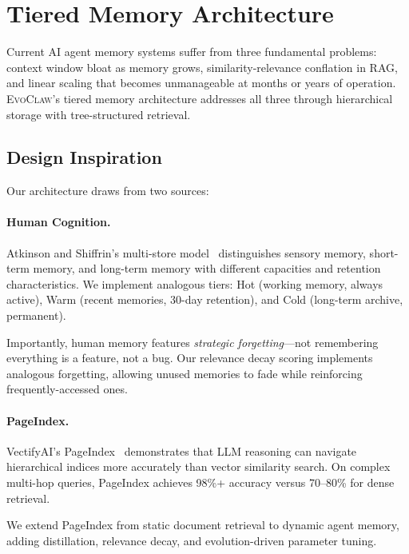 \documentclass{article}
\newcommand{\evoclaw}{\textsc{EvoClaw}}
\begin{document}

\section{Tiered Memory Architecture}
\label{sec:memory}

Current AI agent memory systems suffer from three fundamental problems: context window bloat as memory grows, similarity-relevance conflation in RAG, and linear scaling that becomes unmanageable at months or years of operation. \evoclaw{}'s tiered memory architecture addresses all three through hierarchical storage with tree-structured retrieval.

\subsection{Design Inspiration}

Our architecture draws from two sources:

\paragraph{Human Cognition.} Atkinson and Shiffrin's multi-store model~\cite{atkinson1971human} distinguishes sensory memory, short-term memory, and long-term memory with different capacities and retention characteristics. We implement analogous tiers: Hot (working memory, always active), Warm (recent memories, 30-day retention), and Cold (long-term archive, permanent).

Importantly, human memory features \textit{strategic forgetting}—not remembering everything is a feature, not a bug. Our relevance decay scoring implements analogous forgetting, allowing unused memories to fade while reinforcing frequently-accessed ones.

\paragraph{PageIndex.} VectifyAI's PageIndex~\cite{vectifyai_pageindex} demonstrates that LLM reasoning can navigate hierarchical indices more accurately than vector similarity search. On complex multi-hop queries, PageIndex achieves 98\%+ accuracy versus 70--80\% for dense retrieval.

We extend PageIndex from static document retrieval to dynamic agent memory, adding distillation, relevance decay, and evolution-driven parameter tuning.
\end{document}
